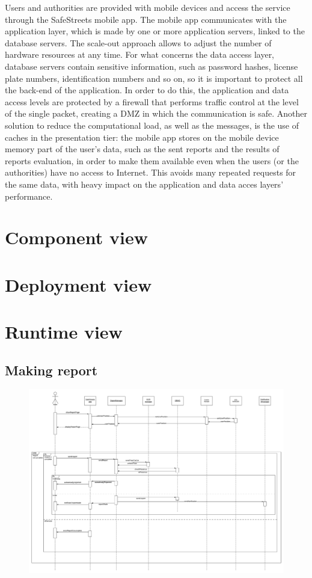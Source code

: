 \documentclass[12pt,a4paper]{report}
\begin{document}
	Users and authorities are provided with mobile devices and access the service through
	the SafeStreets mobile app. The mobile app communicates with the application layer, which
	is made by one or more application servers, linked to the database servers. The scale-out approach allows to adjust the number of hardware resources at any time. For what concerns the data access layer, database servers contain sensitive information, such as password hashes, license plate numbers, identification numbers and so on, so it is important to protect all the back-end of the application. In order to do this, the application and data access levels are protected by a firewall that performs traffic control at the level of the single packet, creating a DMZ in which the communication is safe. Another solution to reduce the computational load, as well as the messages, is the use of caches in the presentation tier: the mobile app stores on the mobile device memory part of the user's data, such as the sent reports and the results of reports evaluation, in order to make them available even when the users (or the authorities) have no access to Internet. This avoids many repeated requests for the same data, with heavy impact on the application and data acces layers' performance.

		\section{Component view}
		\section{Deployment view}
		\section{Runtime view}
			\subsection{Making report}					
				\begin{figure}[H]
						\includegraphics[width = 1.5\textwidth, center]{Report}
						\caption{}
				\end{figure}
\end{document}
